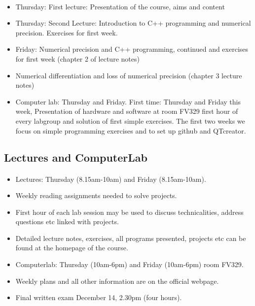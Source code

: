 \documentclass[%
oneside,                 %
final,                   %
10pt]{article}
\begin{document}
\paragraph{}
\begin{itemize}
  \item Thursday: First lecture: Presentation of the course, aims and content

  \item Thursday: Second Lecture: Introduction to C++ programming and numerical precision. Exercises for first week. 

  \item Friday: Numerical precision and C++ programming, continued and exercises for first week (chapter 2 of lecture notes)

  \item Numerical differentiation and loss of numerical precision (chapter 3 lecture notes)

  \item Computer lab: Thursday and Friday. First time: Thursday and Friday this week, Presentation of hardware and software at room FV329 first hour of every labgroup and solution of first simple exercises. The first two weeks we focus on simple programming exercises and to set up github and QTcreator.
\end{itemize}

\noindent



\subsection*{Lectures and ComputerLab}


\paragraph{}
\begin{itemize}
  \item Lectures: Thursday (8.15am-10am) and Friday (8.15am-10am).

  \item Weekly reading assignments needed to solve projects.

  \item First hour of each lab session may be used to discuss technicalities, address questions etc linked with projects.

  \item Detailed lecture notes, exercises, all programs presented, projects etc can be found at the homepage of the course.

  \item Computerlab: Thursday (10am-6pm) and Friday (10am-6pm) room FV329.

  \item Weekly plans and all other information are on the official webpage.

  \item Final written exam December 14, 2.30pm (four hours).
\end{itemize}
\end{document}
